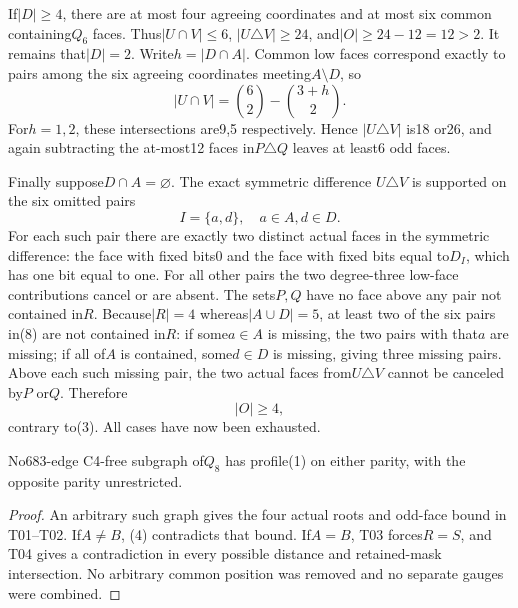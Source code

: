 \documentclass{article}
\begin{document}
If$|D|\ge4$, there are at most four agreeing coordinates and at most
six common containing$Q_6$ faces. Thus$|U\cap V|\le6$,
$|U\triangle V|\ge24$, and$|O|\ge24-12=12>2$.
It remains that$|D|=2$. Write$h=|D\cap A|$.
Common low faces correspond exactly to pairs among the six agreeing
coordinates meeting$A\setminus D$, so
\[
       |U\cap V|=\binom62-\binom{3+h}2.                \tag{7}
\]
For$h=1,2$, these intersections are9,5 respectively. Hence
$|U\triangle V|$ is18 or26, and again subtracting the at-most12
faces in$P\triangle Q$ leaves at least6 odd faces.

Finally suppose$D\cap A=\varnothing$. The exact symmetric difference
$U\triangle V$ is supported on the six omitted pairs
\[
                         I=\{a,d\},\quad a\in A,d\in D. \tag{8}
\]
For each such pair there are exactly two distinct actual faces in the
symmetric difference: the face with fixed bits0 and the face with
fixed bits equal to$D_I$, which has one bit equal to one. For all other
pairs the two degree-three low-face contributions cancel or are absent.
The sets$P,Q$ have no face above any pair not contained in$R$.
Because$|R|=4$ whereas$|A\cup D|=5$, at least two of the six pairs
in(8) are not contained in$R$: if some$a\in A$ is missing, the two
pairs with that$a$ are missing; if all of$A$ is contained, some$d\in D$
is missing, giving three missing pairs. Above each such missing pair,
the two actual faces from$U\triangle V$ cannot be canceled by$P$ or$Q$.
Therefore
\[
                              |O|\ge4,                  \tag{9}
\]
contrary to(3). All cases have now been exhausted.

\begin{theorem}
No683-edge C4-free subgraph of$Q_8$ has profile(1) on either parity,
with the opposite parity unrestricted.
\end{theorem}
\begin{proof}
An arbitrary such graph gives the four actual roots and odd-face bound
in T01--T02. If$A\ne B$, (4) contradicts that bound. If$A=B$, T03
forces$R=S$, and T04 gives a contradiction in every possible distance
and retained-mask intersection. No arbitrary common position was
removed and no separate gauges were combined.
\end{proof}
\end{document}
